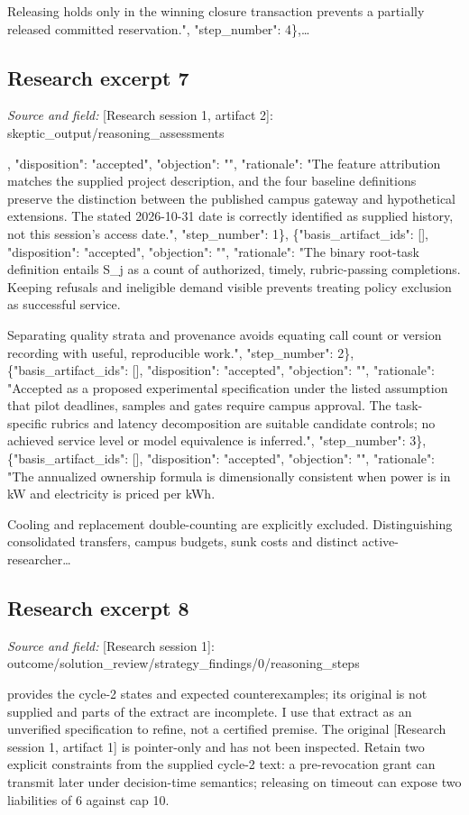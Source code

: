 \documentclass[11pt]{article}
\begin{document}
Releasing holds only in the winning closure transaction prevents a partially released committed reservation.", "step\_number": 4\},\ldots{}

\subsection{Research excerpt 7}
\textit{Source and field: }[Research session 1, artifact 2]: skeptic\_output/reasoning\_assessments\par
[\{"basis\_artifact\_ids": [], "disposition": "accepted", "objection": "", "rationale": "The feature attribution matches the supplied project description, and the four baseline definitions preserve the distinction between the published campus gateway and hypothetical extensions. The stated 2026-10-31 date is correctly identified as supplied history, not this session's access date.", "step\_number": 1\}, \{"basis\_artifact\_ids": [], "disposition": "accepted", "objection": "", "rationale": "The binary root-task definition entails S\_j as a count of authorized, timely, rubric-passing completions. Keeping refusals and ineligible demand visible prevents treating policy exclusion as successful service.

Separating quality strata and provenance avoids equating call count or version recording with useful, reproducible work.", "step\_number": 2\}, \{"basis\_artifact\_ids": [], "disposition": "accepted", "objection": "", "rationale": "Accepted as a proposed experimental specification under the listed assumption that pilot deadlines, samples and gates require campus approval. The task-specific rubrics and latency decomposition are suitable candidate controls; no achieved service level or model equivalence is inferred.", "step\_number": 3\}, \{"basis\_artifact\_ids": [], "disposition": "accepted", "objection": "", "rationale": "The annualized ownership formula is dimensionally consistent when power is in kW and electricity is priced per kWh.

Cooling and replacement double-counting are explicitly excluded. Distinguishing consolidated transfers, campus budgets, sunk costs and distinct active-researcher\ldots{}

\subsection{Research excerpt 8}
\textit{Source and field: }[Research session 1]: outcome/solution\_review/strategy\_findings/0/reasoning\_steps\par
[\{"argument": "The supplied extract of [Research session 1, artifact 4] provides the cycle-2 states and expected counterexamples; its original is not supplied and parts of the extract are incomplete. I use that extract as an unverified specification to refine, not a certified premise. The original [Research session 1, artifact 1] is pointer-only and has not been inspected. Retain two explicit constraints from the supplied cycle-2 text: a pre-revocation grant can transmit later under decision-time semantics; releasing on timeout can expose two liabilities of 6 against cap 10.
\end{document}

